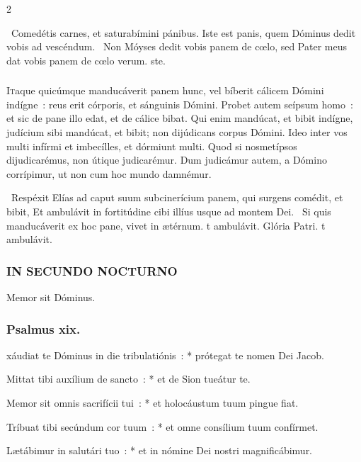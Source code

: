 \documentclass[9pt,twoside]{extarticle}
\begin{document}
\begin{multicols}{2}
\begin{tightlist}{}
\item {}~Comedétis carnes, et saturabímini pánibus. \textred{*} Iste est panis, quem Dóminus dedit vobis ad vescéndum. ~Non Móyses dedit vobis panem de cœlo, sed Pater meus dat vobis panem de cœlo verum. ste.
\end{tightlist}

\subsubsection*{\center{}}
\lettrine{I}taque quicúmque manducáverit panem hunc, vel bíberit cálicem Dómini indígne~: reus erit córporis, et sánguinis Dómini. Probet autem seípsum homo~: et sic de pane illo edat, et de cálice bibat. Qui enim mandúcat, et bibit indígne, judícium sibi mandúcat, et bibit; non dijúdicans corpus Dómini. Ideo inter vos multi infírmi et imbecílles, et dórmiunt multi. Quod si nosmetípsos dijudicarémus, non útique judicarémur. Dum judicámur autem, a Dómino corrípimur, ut non cum hoc mundo damnémur.

\begin{tightlist}{}
\item {}~Respéxit Elías ad caput suum subcinerícium panem, qui surgens comédit, et bibit, \textred{*} Et ambulávit in fortitúdine cibi illíus usque ad montem Dei. ~Si quis manducáverit ex hoc pane, vivet in ætérnum. t ambulávit. Glória Patri. t ambulávit.
\end{tightlist}

\subsubsection*{\center \textsc{IN SECUNDO NOCTURNO}}
 Memor sit Dóminus.
\subsubsection*{\center Psalmus xix.}
xáudiat te Dóminus in die tribulatiónis~: * prótegat te nomen Dei Jacob.

Mittat tibi auxílium de sancto~: * et de Sion tueátur te.

Memor sit omnis sacrifícii tui~: * et holocáustum tuum pingue fiat.

Tríbuat tibi secúndum cor tuum~: * et omne consílium tuum confírmet.

Lætábimur in salutári tuo~: * et in nómine Dei nostri magnificábimur.


\end{multicols}
\end{document}
